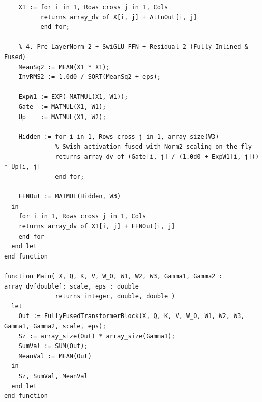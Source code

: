 \begin{lstlisting}[language=Sisal,caption={Fully Inlined \& Fused Transformer Block (\texttt{transformer\_fully\_inlined\_dv.sis})}]
    % 3. Residual 1 (Inlined Addition)
    X1 := for i in 1, Rows cross j in 1, Cols
          returns array_dv of X[i, j] + AttnOut[i, j]
          end for;
          
    % 4. Pre-LayerNorm 2 + SwiGLU FFN + Residual 2 (Fully Inlined & Fused)
    MeanSq2 := MEAN(X1 * X1);
    InvRMS2 := 1.0d0 / SQRT(MeanSq2 + eps);
    
    ExpW1 := EXP(-MATMUL(X1, W1));
    Gate  := MATMUL(X1, W1);
    Up    := MATMUL(X1, W2);
    
    Hidden := for i in 1, Rows cross j in 1, array_size(W3)
              % Swish activation fused with Norm2 scaling on the fly
              returns array_dv of (Gate[i, j] / (1.0d0 + ExpW1[i, j])) * Up[i, j]
              end for;
              
    FFNOut := MATMUL(Hidden, W3)
  in
    for i in 1, Rows cross j in 1, Cols
    returns array_dv of X1[i, j] + FFNOut[i, j]
    end for
  end let
end function

function Main( X, Q, K, V, W_O, W1, W2, W3, Gamma1, Gamma2 : array_dv[double]; scale, eps : double 
              returns integer, double, double )
  let
    Out := FullyFusedTransformerBlock(X, Q, K, V, W_O, W1, W2, W3, Gamma1, Gamma2, scale, eps);
    Sz := array_size(Out) * array_size(Gamma1);
    SumVal := SUM(Out);
    MeanVal := MEAN(Out)
  in
    Sz, SumVal, MeanVal
  end let
end function
\end{lstlisting}

